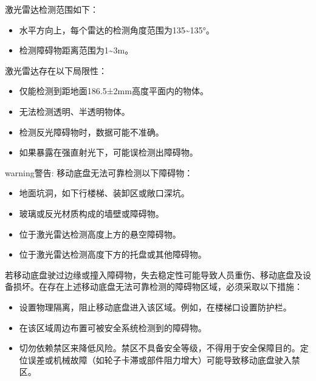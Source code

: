\documentclass[a4paper,11pt,english,openany,oneside]{sphinxmanual}
\begin{document}
\sphinxAtStartPar
激光雷达检测范围如下：
\begin{itemize}
\item {} 
\sphinxAtStartPar
水平方向上，每个雷达的检测角度范围为\sphinxhyphen{}135\textasciitilde{}135°。

\item {} 
\sphinxAtStartPar
检测障碍物距离范围为1\textasciitilde{}3m。

\end{itemize}

\sphinxAtStartPar
激光雷达存在以下局限性：
\begin{itemize}
\item {} 
\sphinxAtStartPar
仅能检测到距地面186.5±2mm高度平面内的物体。

\item {} 
\sphinxAtStartPar
无法检测透明、半透明物体。

\item {} 
\sphinxAtStartPar
检测反光障碍物时，数据可能不准确。

\item {} 
\sphinxAtStartPar
如果暴露在强直射光下，可能误检测出障碍物。

\end{itemize}

\begin{sphinxadmonition}{warning}{警告:}
\sphinxAtStartPar
移动底盘无法可靠检测以下障碍物：
\begin{itemize}
\item {} 
\sphinxAtStartPar
地面坑洞，如下行楼梯、装卸区或敞口深坑。

\item {} 
\sphinxAtStartPar
玻璃或反光材质构成的墙壁或障碍物。

\item {} 
\sphinxAtStartPar
位于激光雷达检测高度上方的悬空障碍物。

\item {} 
\sphinxAtStartPar
位于激光雷达检测高度下方的托盘或其他障碍物。

\end{itemize}

\sphinxAtStartPar
若移动底盘驶过边缘或撞入障碍物，失去稳定性可能导致人员重伤、移动底盘及设备损坏。在存在上述移动底盘无法可靠检测的障碍物区域，必须采取以下措施：
\begin{itemize}
\item {} 
\sphinxAtStartPar
设置物理隔离，阻止移动底盘进入该区域。例如，在楼梯口设置防护栏。

\item {} 
\sphinxAtStartPar
在该区域周边布置可被安全系统检测到的障碍物。

\item {} 
\sphinxAtStartPar
切勿依赖禁区来降低风险。禁区不具备安全等级，不得用于安全保障目的。定位误差或机械故障（如轮子卡滞或部件阻力增大）可能导致移动底盘驶入禁区。

\end{itemize}
\end{sphinxadmonition}
\end{document}
